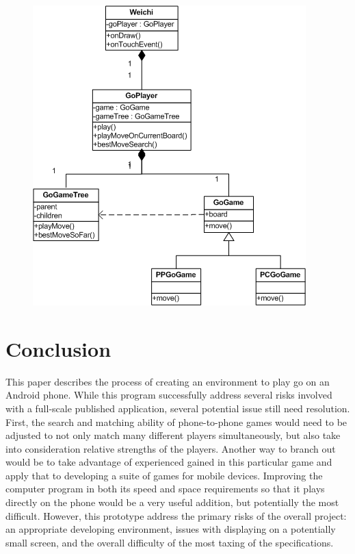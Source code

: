 \documentclass[acmtocl]{acmtrans2m}
\begin{document}
\begin{figure}[t]
 \centering
 \includegraphics[width = \linewidth]{fig/class}
 \label{fig:class}
\end{figure}


\section{Conclusion}
This paper describes the process of creating an environment to play go on an Android phone.  While this program successfully address several risks involved with a full-scale published application, several potential issue still need resolution.  First, the search and matching ability of phone-to-phone games would need to be adjusted to not only match many different players simultaneously, but also take into consideration relative strengths of the players.   Another way to branch out would be to take advantage of experienced gained in this particular game and apply that to developing a suite of games for mobile devices.   Improving the computer program in both its speed and space requirements so that it plays directly on the phone would be a very useful addition, but potentially the most difficult. However, this prototype address the primary risks of the overall project: an appropriate developing environment, issues with displaying on a potentially small screen, and the overall difficulty of the most taxing of the specifications.  
\end{document}
